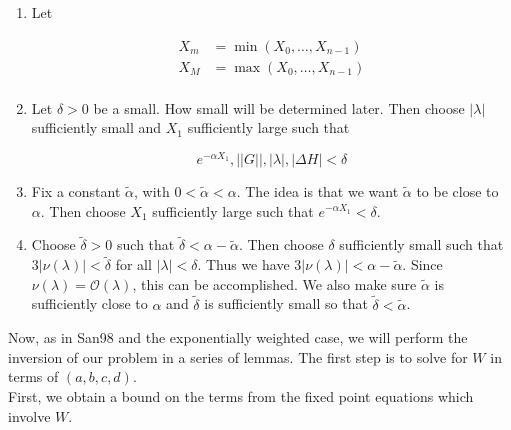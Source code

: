 \documentclass[12pt]{article}
\begin{document}
\begin{enumerate}

	\item Let

	\begin{align*}
	X_m &= \min(X_0, \dots, X_{n-1}) \\
	X_M &= \max(X_0, \dots, X_{n-1}) \\
	\end{align*}

	\item Let $\delta > 0$ be a small. How small will be determined later. Then choose $|\lambda|$ sufficiently small and $X_1$ sufficiently large such that

	\begin{equation}
	e^{-\alpha X_1}, ||G||, |\lambda|, |\Delta H| < \delta
	\end{equation}

	\item Fix a constant $\tilde{\alpha}$, with $0 < \tilde{\alpha} < \alpha$. The idea is that we want $\tilde{\alpha}$ to be close to $\alpha$. Then choose $X_1$ sufficiently large such that $e^{-\alpha X_1} < \delta$.

	\item Choose $\tilde{\delta} > 0$ such that $\tilde{\delta} < \alpha - \tilde{\alpha}$. Then choose $\delta$ sufficiently small such that $3 |\nu(\lambda)| < \tilde{\delta}$ for all $|\lambda| < \delta$. Thus we have $3 |\nu(\lambda)| < \alpha - \tilde{\alpha}$. Since $\nu(\lambda) = \mathcal{O}(\lambda)$, this can be accomplished. We also make sure $\tilde{\alpha}$ is sufficiently close to $\alpha$ and $\tilde{\delta}$ is sufficiently small so that $\tilde{\delta} < \tilde{\alpha}$.

\end{enumerate}


Now, as in San98 and the exponentially weighted case, we will perform the inversion of our problem in a series of lemmas. The first step is to solve for $W$ in terms of $(a, b, c, d)$.\\

First, we obtain a bound on the terms from the fixed point equations which involve $W$. 

\end{document}
